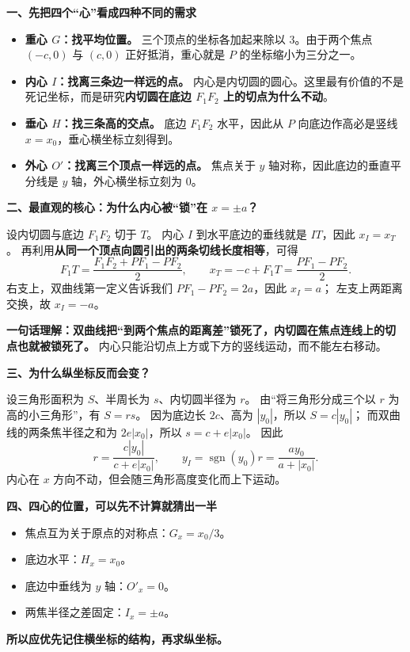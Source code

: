 \begin{explanationbox}
\textbf{一、先把四个“心”看成四种不同的需求}
\begin{itemize}
  \item \textbf{重心 $G$：找平均位置。} 三个顶点的坐标各加起来除以 $3$。由于两个焦点 $(-c,0)$ 与 $(c,0)$ 正好抵消，重心就是 $P$ 的坐标缩小为三分之一。
  \item \textbf{内心 $I$：找离三条边一样远的点。} 内心是内切圆的圆心。这里最有价值的不是死记坐标，而是研究\textbf{内切圆在底边 $F_1F_2$ 上的切点为什么不动}。
  \item \textbf{垂心 $H$：找三条高的交点。} 底边 $F_1F_2$ 水平，因此从 $P$ 向底边作高必是竖线 $x=x_0$，垂心横坐标立刻得到。
  \item \textbf{外心 $O'$：找离三个顶点一样远的点。} 焦点关于 $y$ 轴对称，因此底边的垂直平分线是 $y$ 轴，外心横坐标立刻为 $0$。
\end{itemize}

\textbf{二、最直观的核心：为什么内心被“锁”在 $x=\pm a$？}

设内切圆与底边 $F_1F_2$ 切于 $T$。
内心 $I$ 到水平底边的垂线就是 $IT$，因此 $x_I=x_T$。
再利用\textbf{从同一个顶点向圆引出的两条切线长度相等}，可得
\[
F_1T=\frac{F_1F_2+PF_1-PF_2}{2},\qquad
x_T=-c+F_1T=\frac{PF_1-PF_2}{2}.
\]
右支上，双曲线第一定义告诉我们 $PF_1-PF_2=2a$，因此 $x_I=a$；
左支上两距离交换，故 $x_I=-a$。

\textbf{一句话理解：}\textbf{双曲线把“到两个焦点的距离差”锁死了，内切圆在焦点连线上的切点也就被锁死了。}
内心只能沿切点上方或下方的竖线运动，而不能左右移动。

\textbf{三、为什么纵坐标反而会变？}

设三角形面积为 $S$、半周长为 $s$、内切圆半径为 $r$。
由“将三角形分成三个以 $r$ 为高的小三角形”，有 $S=rs$。
因为底边长 $2c$、高为 $|y_0|$，所以 $S=c|y_0|$；
而双曲线的两条焦半径之和为 $2e|x_0|$，所以 $s=c+e|x_0|$。
因此
\[
r=\frac{c|y_0|}{c+e|x_0|},\qquad
 y_I=\operatorname{sgn}(y_0)r
     =\frac{ay_0}{a+|x_0|}.
\]
内心在 $x$ 方向不动，但会随三角形高度变化而上下运动。

\textbf{四、四心的位置，可以先不计算就猜出一半}
\begin{itemize}
  \item 焦点互为关于原点的对称点：$G_x=x_0/3$。
  \item 底边水平：$H_x=x_0$。
  \item 底边中垂线为 $y$ 轴：$O'_x=0$。
  \item 两焦半径之差固定：$I_x=\pm a$。
\end{itemize}
\textbf{所以应优先记住横坐标的结构，再求纵坐标。}


\end{explanationbox}
